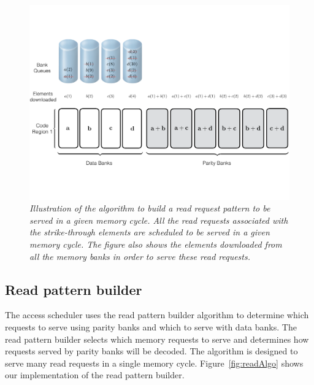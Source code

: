 \begin{figure}[htbp]
	\centering
	\includegraphics[width=0.96\linewidth]{fig/Read-Algo-Example.pdf}
	\caption{{\it{Illustration of the algorithm to build a read request pattern to be served in a given memory cycle. All the read requests associated with the strike-through elements are scheduled to be served in a given memory cycle. The figure also shows the elements downloaded from all the memory banks in order to serve these read requests.}}}
	\label{fig:readAlgoAccessPattern}
\end{figure}
\subsection{Read pattern builder}
\label{sec:readCodingAlgo}


The access scheduler uses the read pattern builder algorithm to determine which requests to serve using parity banks and which to serve with data banks. The read pattern builder selects which memory requests to serve and determines how requests served by parity banks will be decoded. The algorithm is designed to serve many read requests in a single memory cycle. Figure~\ref{fig:readAlgo} shows our implementation of the read pattern builder.

